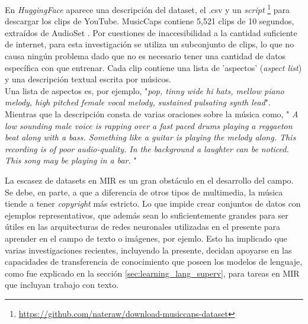 En \textit{HuggingFace} \cite{huggFaceMusicCaps} aparece una descripción del dataset, el .csv y  un \textit{script} \footnote{\href{https://github.com/nateraw/download-musiccaps-dataset}{https://github.com/nateraw/download-musiccaps-dataset}}  para descargar los clips de YouTube. MusicCaps contiene 5,521 clips de 10 segundos, extraídos de AudioSet \cite{Gemmeke2017AudioSA}. Por cuestiones de inaccesibilidad a la cantidad suficiente de internet, para esta investigación se utiliza un subconjunto de clips, lo que no causa ningún problema dado que no es necesario tener una cantidad de datos específica con que entrenar. Cada clip contiene una lista de 'aspectos' (\textit{aspect list}) y una descripción textual escrita por músicos. \\
Una lista de aspectos es, por ejemplo, "\textit{pop, tinny wide hi hats, mellow piano melody, high pitched female vocal melody, sustained pulsating synth lead}". \\
Mientras que la descripción consta de varias oraciones sobre la música como, " \textit{A low sounding male voice is rapping over a fast paced drums playing a reggaeton beat along with a bass. Something like a guitar is playing the melody along. This recording is of poor audio-quality. In the background a laughter can be noticed. This song may be playing in a bar.} "

La escasez de datasets en MIR es un gran obstáculo en el desarrollo del campo. Se debe, en parte, a que a diferencia de otros tipos de multimedia, la música tiende a tener \textit{copyright} más estricto. Lo que impide crear conjuntos de datos con ejemplos representativos, que además sean lo suficientemente grandes para ser útiles en las arquitecturas de redes neuronales utilizadas en el presente para aprender en el campo de texto o imágenes, por ejemlo. Esto ha implicado que varias investigaciones recientes, incluyendo la presente, decidan apoyarse en las capacidades de transferencia de conocimiento que poseen los modelos de lenguaje, como fue explicado en la sección \ref{sec:learning_lang_superv}, para tareas en MIR que incluyan trabajo con texto.
